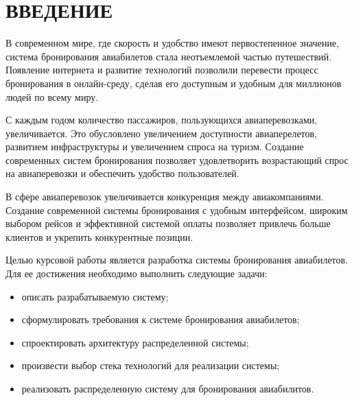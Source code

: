 \part*{ВВЕДЕНИЕ}
В современном мире, где скорость и удобство имеют первостепенное значение, система бронирования авиабилетов стала неотъемлемой частью путешествий. Появление интернета и развитие технологий позволили перевести процесс бронирования в онлайн-среду, сделав его доступным и удобным для миллионов людей по всему миру. 

С каждым годом количество пассажиров, пользующихся авиаперевозками, увеличивается. Это обусловлено увеличением доступности авиаперелетов, развитием инфраструктуры и увеличением спроса на туризм. Создание современных систем бронирования позволяет удовлетворить возрастающий спрос на авиаперевозки и обеспечить удобство пользователей.

В сфере авиаперевозок увеличивается конкуренция между авиакомпаниями. Создание современной системы бронирования с удобным интерфейсом, широким выбором рейсов и эффективной системой оплаты позволяет привлечь больше клиентов и укрепить конкурентные позиции.

Целью курсовой работы является разработка системы бронирования авиабилетов. Для ее достижения необходимо выполнить следующие задачи:

\begin{itemize}[label = ---]
  \item описать разрабатываемую систему;
  \item сформулировать требования к системе бронирования авиабилетов;
  \item спроектировать архитектуру распределенной системы;
  \item произвести выбор стека технологий для реализации системы;
  \item реализовать распределенную систему для бронирования авиабилитов.
\end{itemize}


